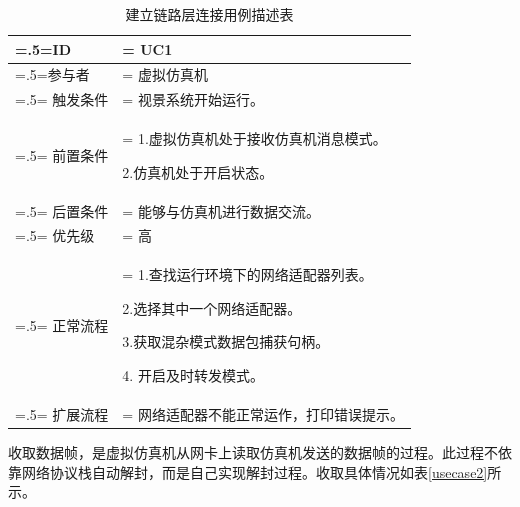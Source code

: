\begin{table}[htbp]
    \begin{center}
        \caption{建立链路层连接用例描述表}
        \label{usecase1}
        \renewcommand\arraystretch{1.5}
        \begin{tabularx}{0.8\textwidth}{ 
            | >{\centering\arraybackslash\hsize=.5\hsize\linewidth=\hsize}X 
            | >{\raggedright\arraybackslash\hsize=1.5\hsize\linewidth=\hsize}X 
            | }
            \hline
            \textbf{ID} & \textbf{UC1}\\
            \hline
            参与者 & 虚拟仿真机\\
            \hline
            触发条件 & 视景系统开始运行。\\
            \hline
            前置条件 & 1.虚拟仿真机处于接收仿真机消息模式。\par2.仿真机处于开启状态。\\
            \hline
            后置条件 & 能够与仿真机进行数据交流。\\
            \hline
            优先级 & 高\\
            \hline
            正常流程 &  1.查找运行环境下的网络适配器列表。\par 2.选择其中一个网络适配器。\par 3.获取混杂模式数据包捕获句柄。\par 4. 开启及时转发模式。\\
            \hline
            扩展流程 & 网络适配器不能正常运作，打印错误提示。\\
            \hline
        \end{tabularx}
    \end{center}
\end{table}
\par
收取数据帧，是虚拟仿真机从网卡上读取仿真机发送的数据帧的过程。此过程不依靠网络协议栈自动解封，而是自己实现解封过程。收取具体情况如表\ref{usecase2}所示。
